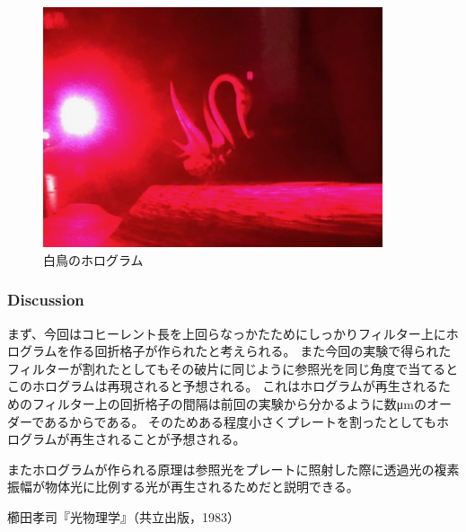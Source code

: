 \documentclass[11pt, a4paper]{jsarticle}
\begin{document}
 \begin{figure}[htbp]
  \begin{center}
   \includegraphics[width=100mm]{fig24.png}
  \end{center}
  \caption{白鳥のホログラム}
  \label{fig:24}
 \end{figure}
\newpage
 \subsubsection{Discussion}
 まず、今回はコヒーレント長を上回らなっかたためにしっかりフィルター上にホログラムを作る回折格子が作られたと考えられる。
 また今回の実験で得られたフィルターが割れたとしてもその破片に同じように参照光を同じ角度で当てるとこのホログラムは再現されると予想される。
 これはホログラムが再生されるためのフィルター上の回折格子の間隔は前回の実験から分かるように数μmのオーダーであるからである。
 そのためある程度小さくプレートを割ったとしてもホログラムが再生されることが予想される。

 またホログラムが作られる原理は参照光をプレートに照射した際に透過光の複素振幅が物体光に比例する光が再生されるためだと説明できる。
\begin{thebibliography}{99}
   櫛田孝司『光物理学』（共立出版，1983）
\end{thebibliography}
\end{document}
